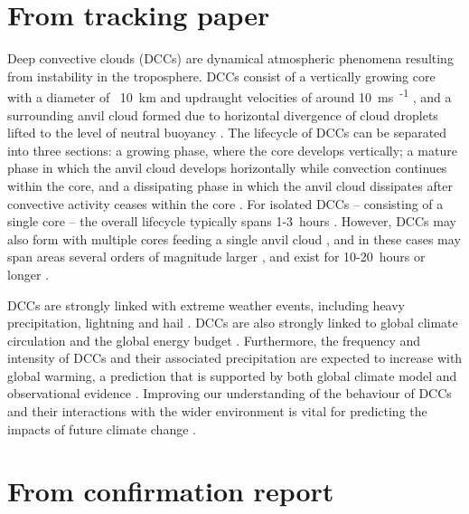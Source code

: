 \section{From tracking paper}


Deep convective clouds (DCCs) are dynamical atmospheric phenomena resulting from instability in the troposphere.
DCCs consist of a vertically growing core with a diameter of ~10~\unit{km} and updraught velocities of around 10~\unit{ms\textsuperscript{-1}} \citep{weisman_mesoscale_2015}, and a surrounding anvil cloud formed due to horizontal divergence of cloud droplets lifted to the level of neutral buoyancy \citep{houze_chapter_2014}.
The lifecycle of DCCs can be separated into three sections: a growing phase, where the core develops vertically; a mature phase in which the anvil cloud develops horizontally while convection continues within the core, and a dissipating phase in which the anvil cloud dissipates after convective activity ceases within the core \citep{wall_life_2018}.
For isolated DCCs -- consisting of a single core -- the overall lifecycle typically spans 1-3~hours \citep{chen_diurnal_1997}.
However, DCCs may also form with multiple cores feeding a single anvil cloud \citep{roca_simple_2017}, and in these cases may span areas several orders of magnitude larger \citep{houze_mesoscale_2004}, and exist for 10-20~hours or longer \citep{chen_diurnal_1997}.

DCCs are strongly linked with extreme weather events, including heavy precipitation, lightning and hail \citep{westra_future_2014, houze_chapter_2014, williams_radar_1992, bruning_theory_2013, punge_hail_2016, matsudo_severe_2011}. 
DCCs are also strongly linked to global climate circulation and the global energy budget \citep{houze_mesoscale_2004, fritsch_mesoscale_2001, johnson_mesoscale_2001}.
Furthermore, the frequency and intensity of DCCs and their associated precipitation are expected to increase with global warming, a prediction that is supported by both global climate model \citep{allen_constraints_2002, trenberth_changing_2003, held_robust_2006, muller_energetic_2011, ogorman_energetic_2012, ogorman_precipitation_2015} and observational evidence \citep{tan_increases_2015, berg_strong_2013, aumann_increased_2018, houze_extreme_2019}.
Improving our understanding of the behaviour of DCCs and their interactions with the wider environment is vital for predicting the impacts of future climate change \citep{westra_future_2014}.


\section{From confirmation report}

